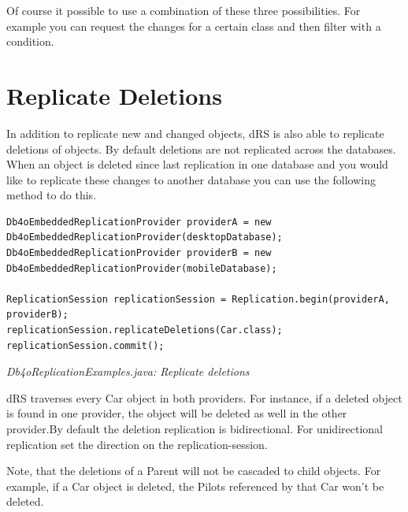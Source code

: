 Of course it possible to use a combination of these three possibilities. For example you can request the changes for a certain class and then filter with a condition.

\section{Replicate Deletions}
\label{drs:db4o-replication-system-drs-db4o-databases-replication-deleted-objects-replication}

In addition to replicate new and changed objects, dRS is also able to replicate deletions of objects. By default deletions are not replicated across the databases. When an object is deleted since last replication in one database and you would like to replicate these changes to another database you can use the following method to do this.

\begin{lstlisting}
Db4oEmbeddedReplicationProvider providerA = new Db4oEmbeddedReplicationProvider(desktopDatabase);
Db4oEmbeddedReplicationProvider providerB = new Db4oEmbeddedReplicationProvider(mobileDatabase);

ReplicationSession replicationSession = Replication.begin(providerA, providerB);
replicationSession.replicateDeletions(Car.class);
replicationSession.commit();
\end{lstlisting}

{\small\itshape Db4oReplicationExamples.java: Replicate deletions\par}
\medskip

dRS traverses every Car object in both providers. For instance, if a deleted object is found in one provider, the object will be deleted as well in the other provider.By default the deletion replication is bidirectional. For unidirectional replication set the direction on the replication-session.

Note, that the deletions of a Parent will not be cascaded to child objects. For example, if a Car object is deleted, the Pilots referenced by that Car won't be deleted.

